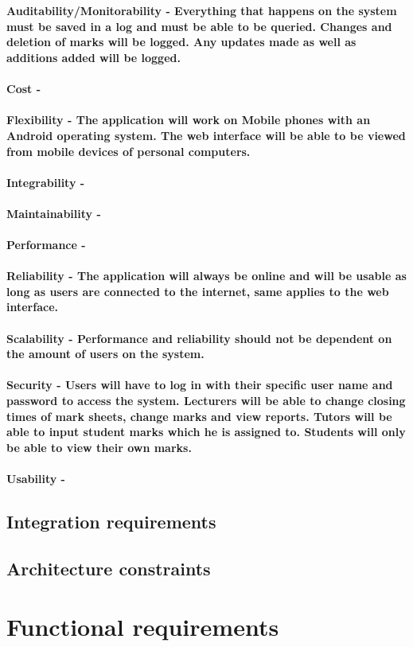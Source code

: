 \documentclass[12pt]{article}
\begin{document}
  \paragraph*{
  \\Auditability/Monitorability - Everything that happens on the system must be saved in a log and must be able to be queried. Changes and deletion of marks will be logged. Any updates made as well as additions added will be logged.
  \\\\Cost - 
  \\\\Flexibility - The application will work on Mobile phones with an Android operating system. The web interface will be able to be viewed from mobile devices of personal computers.
  \\\\Integrability - 
  \\\\Maintainability - 
  \\\\Performance - 
  \\\\Reliability - The application will always be online and will be usable as long as users are connected to the internet, same applies to the web interface.
  \\\\Scalability - Performance and reliability should not be dependent on the amount of users on the system.
  \\\\Security - Users will have to log in with their specific user name and password to access the system. Lecturers will be able to change closing times of mark sheets, change marks and view reports. Tutors will be able to input student marks which he is assigned to. Students will only be able to view their own marks.
  \\\\Usability - }
  \subsection{Integration requirements}
  \subsection{Architecture constraints}
  \section{Functional requirements}
\end{document}

